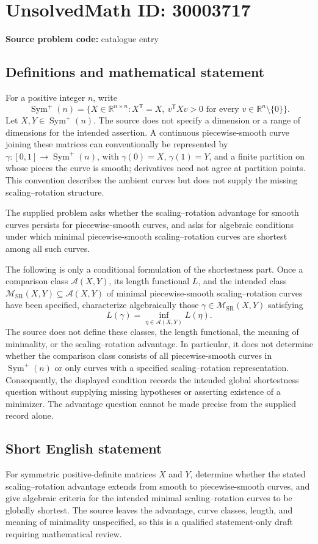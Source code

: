 \documentclass[11pt]{article}
\newcommand{\R}{\mathbb{R}}
\begin{document}
\section*{UnsolvedMath ID: 30003717}
\textbf{Source problem code:} catalogue entry
\subsection{Definitions and mathematical statement}
For a positive integer \(n\), write
\[
\operatorname{Sym}^{+}(n)=\{X\in\R^{n\times n}:X^{\mathsf T}=X,\ v^{\mathsf T}Xv>0\text{ for every }v\in\R^n\setminus\{0\}\}.
\]
Let \(X,Y\in\operatorname{Sym}^{+}(n)\). The source does not specify a dimension or a range of dimensions for the intended assertion. A continuous piecewise-smooth curve joining these matrices can conventionally be represented by \(\gamma:[0,1]\to\operatorname{Sym}^{+}(n)\), with \(\gamma(0)=X\), \(\gamma(1)=Y\), and a finite partition on whose pieces the curve is smooth; derivatives need not agree at partition points. This convention describes the ambient curves but does not supply the missing scaling--rotation structure.

The supplied problem asks whether the scaling--rotation advantage for smooth curves persists for piecewise-smooth curves, and asks for algebraic conditions under which minimal piecewise-smooth scaling--rotation curves are shortest among all such curves.

The following is only a conditional formulation of the shortestness part. Once a comparison class \(\mathcal A(X,Y)\), its length functional \(L\), and the intended class \(\mathcal M_{\mathrm{SR}}(X,Y)\subseteq\mathcal A(X,Y)\) of minimal piecewise-smooth scaling--rotation curves have been specified, characterize algebraically those \(\gamma\in\mathcal M_{\mathrm{SR}}(X,Y)\) satisfying
\[
L(\gamma)=\inf_{\eta\in\mathcal A(X,Y)}L(\eta).
\]
The source does not define these classes, the length functional, the meaning of minimality, or the scaling--rotation advantage. In particular, it does not determine whether the comparison class consists of all piecewise-smooth curves in \(\operatorname{Sym}^{+}(n)\) or only curves with a specified scaling--rotation representation. Consequently, the displayed condition records the intended global shortestness question without supplying missing hypotheses or asserting existence of a minimizer. The advantage question cannot be made precise from the supplied record alone.
\subsection{Short English statement}
For symmetric positive-definite matrices \(X\) and \(Y\), determine whether the stated scaling--rotation advantage extends from smooth to piecewise-smooth curves, and give algebraic criteria for the intended minimal scaling--rotation curves to be globally shortest. The source leaves the advantage, curve classes, length, and meaning of minimality unspecified, so this is a qualified statement-only draft requiring mathematical review.
\end{document}
